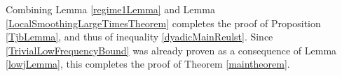 Combining Lemma \ref{regime1Lemma} and Lemma \ref{LocalSmoothingLargeTimesTheorem} completes the proof of Proposition \ref{TjbLemma}, and thus of inequality \eqref{dyadicMainReulst}. Since \eqref{TrivialLowFrequencyBound} was already proven as a consequence of Lemma \ref{lowjLemma}, this completes the proof of Theorem \ref{maintheorem}.






